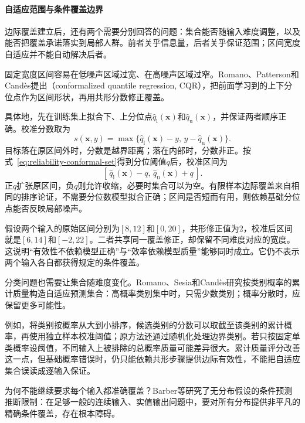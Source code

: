 \paragraph{自适应范围与条件覆盖边界}

边际覆盖建立后，还有两个需要分别回答的问题：集合能否随输入难度调整，以及能否把覆盖承诺落实到局部人群。前者关乎信息量，后者关乎保证范围；区间宽度自适应并不能自动解决后者。

固定宽度区间容易在低噪声区域过宽、在高噪声区域过窄。Romano、Patterson和Candès提出（conformalized quantile regression, CQR），把前面学习到的上下分位点作为区间形状，再用共形分数修正覆盖。

具体地，先在训练集上拟合下、上分位点$\hat q_{\mathrm l}(\bm{x})$和$\hat q_{\mathrm u}(\bm{x})$，并保证两者顺序正确。校准分数取为
\begin{equation}
 s(\bm{x},y)
 =\max\{\hat q_{\mathrm l}(\bm{x})-y,\,
              y-\hat q_{\mathrm u}(\bm{x})\}.
 \label{eq:reliability-cqr-score}
\end{equation}
目标落在原区间外时，分数是越界距离；落在内部时，分数非正。按式~\eqref{eq:reliability-conformal-set}得到分位阈值$q$后，校准区间为
\[
 [\,\hat q_{\mathrm l}(\bm{x})-q,\,
       \hat q_{\mathrm u}(\bm{x})+q\,].
\]
正$q$扩张原区间，负$q$则允许收缩，必要时集合可以为空。有限样本边际覆盖来自相同的排序论证，不需要分位数模型拟合正确；区间是否短而有用，则依赖基础分位点能否反映局部噪声。

假设两个输入的原始区间分别为$[8,12]$和$[0,20]$，共形修正值为2，校准后区间就是$[6,14]$和$[-2,22]$。二者共享同一覆盖修正，却保留不同难度对应的宽度。这说明“有效性不依赖模型正确”与“效率依赖模型质量”能够同时成立。它仍不表示两个输入各自都获得规定的条件覆盖。

分类问题也需要让集合随难度变化。Romano、Sesia和Candès研究按类别概率的累计质量构造自适应预测集合：高概率类别集中时，只需少数类别；概率分散时，应保留更多可能性。

例如，将类别按概率从大到小排序，候选类别的分数可以取截至该类别的累计概率，再使用独立样本校准阈值；原方法还通过随机化处理边界类别。若只按固定单类概率设阈值，不同输入上被排除的总概率质量可能差异很大。累计质量评分改善这一点，但基础概率错误时，仍只能依赖共形步骤提供边际有效性，不能把自适应集合误读成逐输入保证。

为何不能继续要求每个输入都准确覆盖？Barber等研究了无分布假设的条件预测推断限制：在足够一般的连续输入、实值输出问题中，要对所有分布提供非平凡的精确条件覆盖，存在根本障碍。

